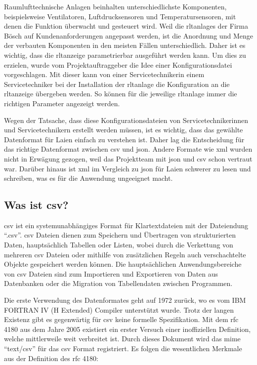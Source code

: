 Raumlufttechnische Anlagen beinhalten unterschiedlichste Komponenten, beispielsweise Ventilatoren, Luftdrucksensoren und Temperatursensoren, mit denen die Funktion überwacht und gesteuert wird. Weil die \acsp{rltanlage} der Firma Bösch auf Kundenanforderungen angepasst werden, ist die Anordnung und Menge der verbauten Komponenten in den meisten Fällen unterschiedlich. Daher ist es wichtig, dass die \acs{rltanzeige} parametrierbar ausgeführt werden kann. Um dies zu erzielen, wurde vom Projektauftraggeber die Idee einer Konfigurationsdatei vorgeschlagen. Mit dieser kann von einer  Servicetechnikerin \bzw einem Servicetechniker bei der Installation der \acs{rltanlage} die Konfiguration an die \acs{rltanzeige} übergeben werden. So können für die jeweilige \acs{rltanlage} immer die richtigen Parameter angezeigt werden.

Wegen der Tatsache, dass diese Konfigurationsdateien von Servicetechnikerinnen und Servicetechnikern erstellt werden müssen, ist es wichtig, dass das gewählte Datenformat für Laien einfach zu verstehen ist. Daher lag die Entscheidung für das richtige Datenformat zwischen \acs{csv} und \acs{json}. Andere Formate  wie \acf{xml} wurden nicht in Erwägung gezogen, weil das Projektteam mit \acs{json} und \acs{csv} schon vertraut war. Darüber hinaus ist \acs{xml} im Vergleich zu \acs{json} für Laien schwerer zu lesen und schreiben, was es für die Anwendung ungeeignet macht. 

\subsection{Was ist \acs{csv}?}\label{csv_kapitel}
\acf{csv} ist ein systemunabhängiges Format für Klartextdateien mit der Dateiendung \enquote{.csv}. \acs{csv} Dateien dienen zum Speichern und Übertragen von strukturierten Daten, hauptsächlich Tabellen oder Listen, wobei durch die Verkettung von mehreren \acs{csv} Dateien oder mithilfe von zusätzlichen Regeln auch verschachtelte Objekte gespeichert werden können. Die hauptsächlichen Anwendungsbereiche von \acs{csv} Dateien sind zum Importieren und Exportieren von Daten aus Datenbanken oder die Migration von Tabellendaten zwischen Programmen. \cite[vgl.][]{FuchsMediaSolutions:o.J.}

Die erste Verwendung des Datenformates geht auf 1972 zurück, wo es vom IBM FORTRAN IV (H Extended) Compiler unterstützt wurde. \cite[vgl.][]{IBM:1972} Trotz der langen Existenz gibt es gegenwärtig für \acs{csv} keine formelle Spezifikation. Mit dem \acs{rfc} 4180 \cite[vgl.][]{Shafranovich:2005} aus dem Jahre 2005 existiert ein erster Versuch einer inoffiziellen Definition, welche mittlerweile weit verbreitet ist. Durch dieses Dokument wird das \acf{mime} \enquote{text/csv} für das \acs{csv} Format registriert. Es folgen die wesentlichen Merkmale aus der Definition des \acs{rfc} 4180:

